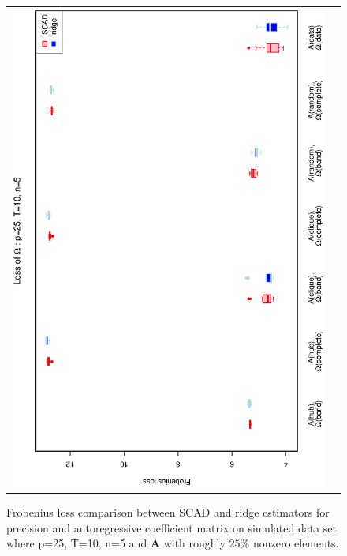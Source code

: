 \documentclass[a4paper]{article}
\begin{document}
\begin{figure}[h!]
\begin{tabular}{cc}
\includegraphics[scale=0.45,angle=270]{LossOmega25T10N5_25.eps}
\end{tabular}
\caption{Frobenius loss comparison between SCAD and ridge estimators for precision and autoregressive coefficient matrix on simulated data set where p=25, T=10, n=5  and $\mathbf{A}$ with roughly $25\%$ nonzero elements.}
\label{figSM:Loss25T10N5_25}
\end{figure}

\end{document}
